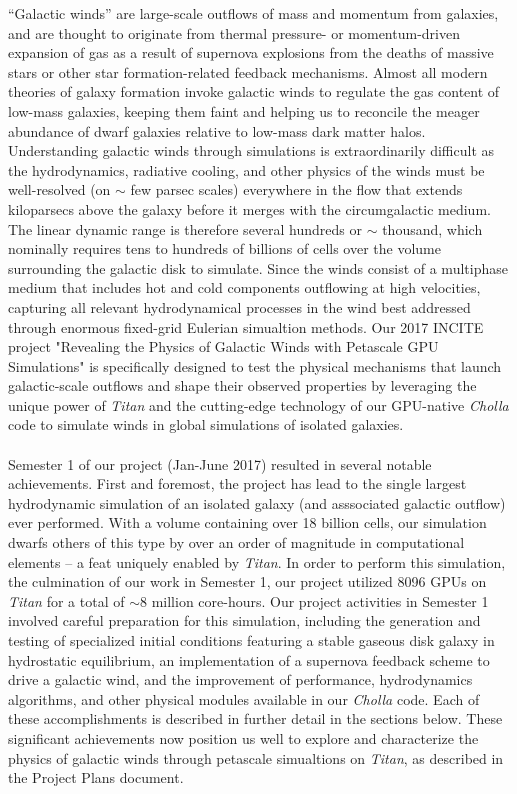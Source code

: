 \documentclass[11pt,letterpaper,english]{article}
\begin{document}
``Galactic winds'' are large-scale outflows of mass and momentum from galaxies, and are thought to originate from thermal pressure- or momentum-driven expansion of gas as a result of supernova explosions
from the deaths of massive stars or other star formation-related feedback mechanisms. Almost all modern
theories of galaxy formation invoke galactic winds to regulate the gas content of low-mass galaxies,
keeping them faint and helping us to reconcile the meager abundance of dwarf galaxies relative to low-mass dark matter halos. Understanding galactic winds through simulations is extraordinarily difficult as the
hydrodynamics, radiative cooling, and other physics of the winds must be well-resolved (on $\sim$ few parsec scales) everywhere in the flow that extends kiloparsecs above the galaxy before it merges with the circumgalactic medium. The linear dynamic range is therefore several hundreds or $\sim$ thousand, which nominally requires tens to hundreds of billions of cells over the volume surrounding the galactic disk
to simulate. Since the winds consist of a multiphase medium that includes hot and cold components outflowing at high velocities, capturing all relevant hydrodynamical processes in the wind best addressed through enormous fixed-grid Eulerian simualtion methods.
Our 2017 INCITE project "Revealing the Physics of Galactic Winds with Petascale GPU Simulations" is specifically designed to test the physical mechanisms that launch galactic-scale outflows and shape
their observed properties by leveraging
the unique power of \textit{Titan} and the cutting-edge technology of our GPU-native \textit{Cholla}
code to simulate winds in global simulations of isolated galaxies.
~\\~\\
Semester 1 of our project (Jan-June 2017) resulted in several notable achievements. First and foremost, the project has lead to the single largest hydrodynamic simulation of an isolated galaxy (and asssociated galactic outflow) ever performed. With a volume containing over 18 billion cells, our simulation dwarfs others of this type by over an order of magnitude in computational elements -- a feat uniquely enabled by \textit{Titan}. In order to perform this simulation, the culmination of our work in Semester 1, our project utilized 8096 GPUs on \textit{Titan} for a total of $\sim$8 million core-hours. Our project activities in Semester 1 involved careful preparation for this simulation, including the generation and testing of specialized initial conditions featuring a stable gaseous disk galaxy in hydrostatic equilibrium, an implementation of a supernova feedback scheme to drive a galactic wind, and the improvement of performance,
hydrodynamics algorithms, and other physical modules available in our \textit{Cholla} code. Each of these accomplishments is described in further detail in the sections below. These significant achievements
now position us well to explore and characterize the physics of galactic winds through petascale simualtions
on \textit{Titan}, as described in the Project Plans document.
\end{document}
